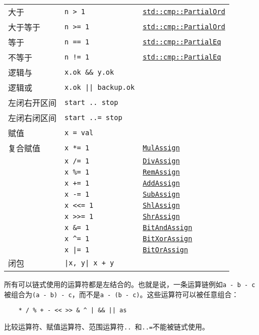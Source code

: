 \begin{longtable}{p{}p{}p{}}
    大于        & \texttt{n > 1}    & \texttt{\hyperref[cmp]{std::cmp::PartialOrd}} \\
    大于等于    & \texttt{n >= 1}   & \texttt{\hyperref[cmp]{std::cmp::PartialOrd}} \\
    等于        & \texttt{n == 1}   & \texttt{\hyperref[equal]{std::cmp::PartialEq}} \\
    不等于      & \texttt{n != 1}   & \texttt{\hyperref[equal]{std::cmp::PartialEq}} \\   
    \hline
    逻辑与      & \texttt{x.ok \&\& y.ok}       & \\
    \cline{1-2}
    逻辑或      & \texttt{x.ok || backup.ok}    & \\
    \cline{1-2}
    左闭右开区间 & \texttt{start .. stop}   & \\
    左闭右闭区间 & \texttt{start ..= stop}  & \\
    \cline{1-2}
    赋值        & \texttt{x = val}  & \\
    复合赋值    & \texttt{x *= 1}   & \texttt{\hyperref[assign]{MulAssign}} \\
                & \texttt{x /= 1}   & \texttt{\hyperref[assign]{DivAssign}} \\
                & \texttt{x \%= 1}  & \texttt{\hyperref[assign]{RemAssign}} \\
                & \texttt{x += 1}   & \texttt{\hyperref[assign]{AddAssign}} \\
                & \texttt{x -= 1}   & \texttt{\hyperref[assign]{SubAssign}} \\
                & \texttt{x <<= 1}  & \texttt{\hyperref[assign]{ShlAssign}} \\
                & \texttt{x >>= 1}  & \texttt{\hyperref[assign]{ShrAssign}} \\
                & \texttt{x \&= 1}  & \texttt{\hyperref[assign]{BitAndAssign}} \\
                & \texttt{x \^{}= 1}& \texttt{\hyperref[assign]{BitXorAssign}} \\
                & \texttt{x |= 1}   & \texttt{\hyperref[assign]{BitOrAssign}} \\
    \cline{1-2}
    闭包        & \texttt{|x, y| x + y} & \\
\end{longtable}

所有可以链式使用的运算符都是左结合的。也就是说，一条运算链例如\texttt{a - b - c}被组合为\texttt{(a - b) - c}，而不是\texttt{a - (b - c)}。这些运算符可以被任意组合：
\begin{verbatim}
    * / % + - << >> & ^ | && || as
\end{verbatim}
比较运算符、赋值运算符、范围运算符\texttt{.. }和\texttt{..=}不能被链式使用。

